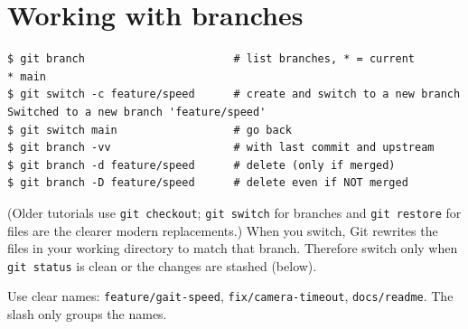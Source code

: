\section*{Working with branches}
\begin{verbatim}
$ git branch                       # list branches, * = current
* main
$ git switch -c feature/speed      # create and switch to a new branch
Switched to a new branch 'feature/speed'
$ git switch main                  # go back
$ git branch -vv                   # with last commit and upstream
$ git branch -d feature/speed      # delete (only if merged)
$ git branch -D feature/speed      # delete even if NOT merged
\end{verbatim}
(Older tutorials use \texttt{git checkout}; \texttt{git switch} for branches and \texttt{git restore} for files are the clearer modern replacements.) When you switch, Git rewrites the files in your working directory to match that branch. Therefore switch only when \texttt{git status} is clean or the changes are stashed (below).

Use clear names: \texttt{feature/gait-speed}, \texttt{fix/camera-timeout}, \texttt{docs/readme}. The slash only groups the names.

